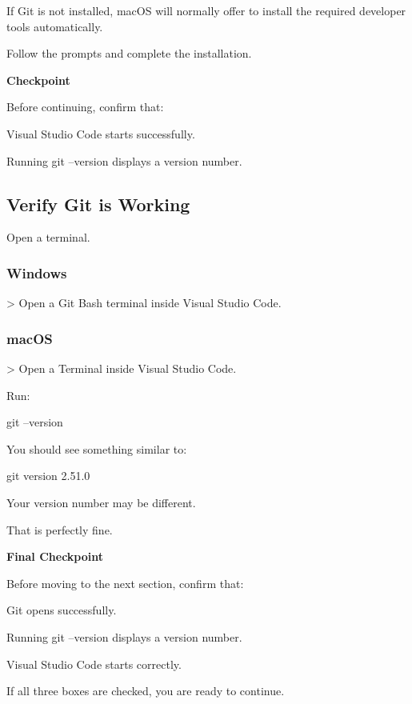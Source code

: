 \documentclass{csc2059practical}
\begin{document}
If Git is not installed, macOS will normally offer to install the required developer tools automatically.

Follow the prompts and complete the installation.

\begin{reflectionbox}
\textbf{Checkpoint}\par
\medskip

Before continuing, confirm that:


Visual Studio Code starts successfully.


Running git --version displays a version number.


\end{reflectionbox}
\subsection{Verify Git is Working}
Open a terminal.

\subsubsection{Windows}
> Open a Git Bash terminal inside Visual Studio Code.

\subsubsection{macOS}
> Open a Terminal inside Visual Studio Code.

Run:

\begin{terminalplain}
git --version
\end{terminalplain}
You should see something similar to:

\begin{terminalplain}
git version 2.51.0
\end{terminalplain}
Your version number may be different.

That is perfectly fine.

\begin{reflectionbox}
\textbf{Final Checkpoint}\par
\medskip

Before moving to the next section, confirm that:


Git opens successfully.


Running git --version displays a version number.


Visual Studio Code starts correctly.


If all three boxes are checked, you are ready to continue.


\end{reflectionbox}
\end{document}

